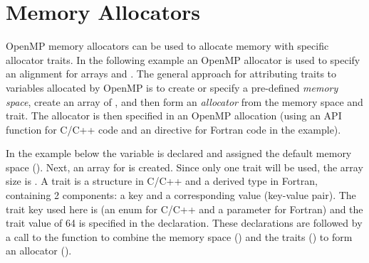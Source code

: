 \section{Memory Allocators}
\label{sec:allocators}





OpenMP memory allocators can be used to allocate memory with
specific allocator traits.  In the following example an OpenMP allocator is used to
specify an alignment for arrays  and . The
general approach for attributing traits to variables allocated by
OpenMP is to create or specify a pre-defined \emph{memory space}, create an
array of , and then form an \emph{allocator} from the
memory space and trait.
The allocator is then specified
in an OpenMP allocation (using an API  function
for C/C++ code and an  directive for Fortran code
in the  example).

In the example below the  variable is declared
and assigned the default memory space ().
Next, an array for  is created. Since only one
trait will be used, the array size is .
A trait is a structure in C/C++ and a derived type in Fortran,
containing 2 components: a key and a corresponding value (key-value pair).
The trait key used here is  (an enum for C/C++
and a parameter for Fortran)
and the trait value of 64 is specified in the  declaration.
These declarations are followed by a call to the
 function to combine the memory
space () and the traits ()
to form an allocator ().

